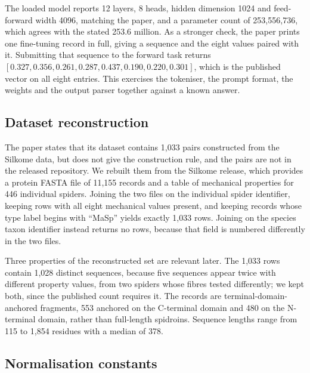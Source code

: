 \documentclass[11pt,a4paper]{article}
\begin{document}
The loaded model reports 12 layers, 8 heads, hidden dimension 1024 and
feed-forward width 4096, matching the paper, and a parameter count of
253{,}556{,}736, which agrees with the stated 253.6 million. As a stronger check,
the paper prints one fine-tuning record in full, giving a sequence and the eight
values paired with it. Submitting that sequence to the forward task returns
$[0.327, 0.356, 0.261, 0.287, 0.437, 0.190, 0.220, 0.301]$, which is the
published vector on all eight entries. This exercises the tokeniser, the prompt
format, the weights and the output parser together against a known answer.

\subsection{Dataset reconstruction}
\label{sec:dataset}

The paper states that its dataset contains 1{,}033 pairs constructed from the
Silkome data, but does not give the construction rule, and the pairs are not in
the released repository. We rebuilt them from the Silkome release, which
provides a protein FASTA file of 11{,}155 records and a table of mechanical
properties for 446 individual spiders. Joining the two files on the individual
spider identifier, keeping rows with all eight mechanical values present, and
keeping records whose type label begins with ``MaSp'' yields exactly 1{,}033
rows. Joining on the species taxon identifier instead returns no rows, because
that field is numbered differently in the two files.

Three properties of the reconstructed set are relevant later. The 1{,}033 rows
contain 1{,}028 distinct sequences, because five sequences appear twice with
different property values, from two spiders whose fibres tested differently; we
kept both, since the published count requires it. The records are
terminal-domain-anchored fragments, 553 anchored on the C-terminal domain and
480 on the N-terminal domain, rather than full-length spidroins. Sequence
lengths range from 115 to 1{,}854 residues with a median of 378.

\subsection{Normalisation constants}
\label{sec:norm}
\end{document}
